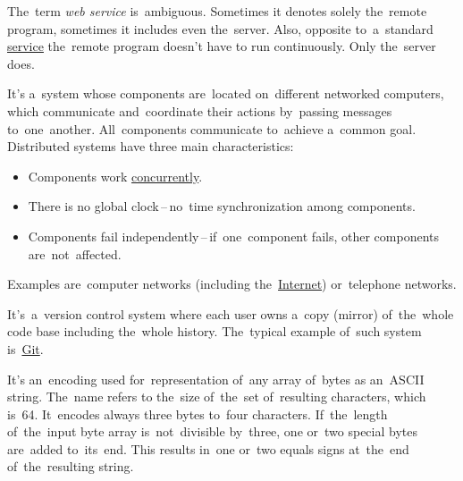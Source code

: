 \warning The~term \textit{web service} is~ambiguous. Sometimes it denotes solely the~remote program, sometimes it includes even the~server. Also, opposite to~a~standard \hyperref[applicationprocessprogramservicethread]{service} the~remote program doesn't have to run continuously. Only the~server does.

\label{32bvs64b}

\label{distributedsystem}
It's a~system whose components are~located on~different networked computers, which communicate and~coordinate their actions by~passing messages to~one~another. All~components communicate to~achieve a~common goal. Distributed systems have three main characteristics:
\begin{itemize}
    \item Components work \hyperref[concurrency]{concurrently}.
    \item There is no global clock\,--\,no~time synchronization among components.
    \item Components fail independently\,--\,if~one~component fails, other components are~not~affected.
\end{itemize}
\noindent Examples are~computer networks (including the~\hyperref[internetweb]{Internet}) or~telephone networks.

\label{distributedversioncontrolsystem}
It's~a~version control system where each user owns a~copy (mirror) of~the~whole code base including the~whole history. The~typical example of~such system is~\hyperref[git]{Git}.


\label{concurrency}

\label{loosetightcoupling}

\label{base64}
It's an~encoding used for~representation of~any array of~bytes as an~ASCII string. The~name refers to the~size of~the~set of~resulting characters, which is~64. It~encodes always three bytes to~four characters. If~the~length of~the~input byte array is~not~divisible by~three, one or~two special bytes are~added to~its~end. This results in~one or~two equals signs at~the~end of~the~resulting string.

